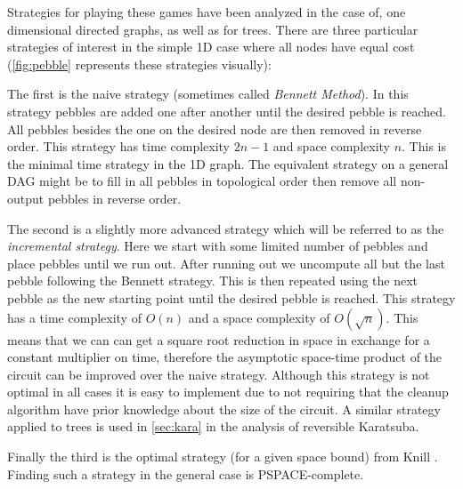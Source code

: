 
Strategies for playing these games have been analyzed in the case of, one
dimensional directed graphs, as well as for trees\cite{peb16}.  There are three
particular strategies of interest in the simple 1D case where all nodes have
equal cost (\cref{fig:pebble} represents these strategies visually):

The first is the naive strategy (sometimes called \emph{Bennett Method}). In
this strategy pebbles are added one after another until the desired pebble is
reached.  All pebbles besides the one on the desired node are then removed in
reverse order. This strategy has time complexity $2n-1$ and space complexity
$n$. This is the minimal time strategy in the 1D graph. The equivalent strategy
on a general DAG might be to fill in all pebbles in topological order then
remove all non-output pebbles in reverse order.

The second is a slightly more advanced strategy which will be referred to as
the \emph{incremental strategy}. Here we start with some limited number of
pebbles and place pebbles until we run out. After running out we uncompute all
but the last pebble following the Bennett strategy. This is then repeated using
the next pebble as the new starting point until the desired pebble is reached.
This strategy has a time complexity of $O(n)$ and a space complexity of
$O(\sqrt n)$. This means that we can can get a square root reduction in space
in exchange for a constant multiplier on time, therefore the asymptotic
space-time product of the circuit can be improved over the naive strategy.
Although this strategy is not optimal in all cases it is easy to implement due
to not requiring that the cleanup algorithm have prior knowledge about the size
of the circuit. A similar strategy applied to trees is used in \cref{sec:kara}
in the analysis of reversible Karatsuba.

Finally the third is the optimal strategy (for a given space bound) from Knill
\cite{knill:95}. Finding such a strategy in the general case is
PSPACE-complete.


